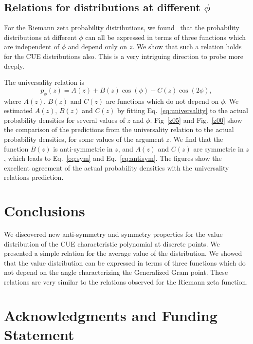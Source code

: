\documentclass[twoside]{article}
\begin{document}
\subsection{\label{relation}Relations for distributions at different $\phi$}



For the Riemann zeta probability distributions, we found~\cite{Shanker 2020}
that the probability distributions at different $\phi$ can all be expressed in
terms of three functions which are independent of $\phi$ and depend only on $z$.
We show that such a relation holds for the CUE distributions also.
This is a very intriguing direction to probe more deeply.

The universality relation is
\begin{equation}
p_{\phi}(z) = A(z) + B(z)\cos(\phi) +C(z)\cos(2\phi),
\label{eq:universality}
\end{equation}
where $A(z)$, $B(z)$ and $C(z)$ are  functions which do not depend on $\phi$. 
We estimated $A(z)$, $B(z)$ and $C(z)$ by fitting Eq.~\ref{eq:universality} to the actual
probability densities for several values of $z$ and $\phi$. 
Fig~\ref{z05} and Fig.~\ref{z00} show the comparison of the predictions 
from the universality 
relation to the actual probability densities, for some values of the argument $z$.
We find that the function 
$B(z)$ is anti-symmetric in $z$, and $A(z)$ and $C(z)$ are symmetric in $z$, which 
leads to Eq.~\ref{eq:sym} and Eq.~\ref{eq:antisym}.
The figures show the excellent agreement of the actual probability densities with the
universality relations prediction.


\section{\label{conclusions}Conclusions}

We discovered new anti-symmetry and symmetry properties 
for the value distribution of the CUE characteristic polynomial at discrete points. 
We presented a simple relation for the average value 
of the  distribution. We showed that the value distribution 
can be expressed in terms of three  functions 
 which do not depend on the angle characterizing the Generalized Gram point. 
These relations are very similar to the relations observed for 
the Riemann zeta function.

\section*{Acknowledgments and Funding Statement}
\end{document}
